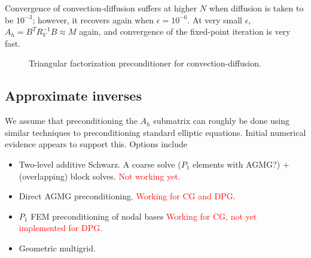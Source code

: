 \documentclass{article}
\begin{document}
Convergence of convection-diffusion suffers at higher $N$ when diffusion is taken to be $10^{-3}$; however, it recovers again when $\epsilon = 10^{-6}$.  At very small $\epsilon$, $A_h = B^TR_V^{-1}B \approx M$ again, and convergence of the fixed-point iteration is very fast.  
\begin{figure}
\centering
{}
\caption{Triangular factorization preconditioner for convection-diffusion.}
\end{figure}

\subsection{Approximate inverses}

We assume that preconditioning the $A_h$ submatrix can roughly be done using similar techniques to preconditioning standard elliptic equations.  Initial numerical evidence appears to support this.  Options include 
\begin{itemize}
\item Two-level additive Schwarz.  A coarse solve ($P_1$ elements with AGMG?) + (overlapping) block solves.  \textcolor{red}{Not working yet.}
\item Direct AGMG preconditioning.  \textcolor{red}{Working for CG and DPG.}
\item $P_1$ FEM preconditioning of nodal bases \textcolor{red}{Working for CG, not yet implemented for DPG.}
\item Geometric multigrid.  
\end{itemize}
\end{document}
